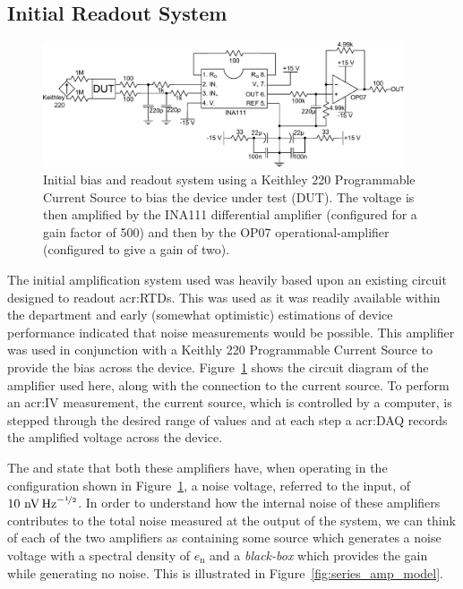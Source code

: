 \subsection{Initial Readout System}
\label{ssec:readout-prelim}
\begin{figure}[ht]
\begin{center}
\includegraphics[width = 0.95\textwidth]{figures/RTD_amp.pdf}
\caption[Initial readout system using RTD amplifier and programmable current source]{Initial bias and readout system using a Keithley 220 Programmable Current Source to bias the device under test (DUT). The voltage is then amplified by the INA111 differential amplifier (configured for a gain factor of 500) and then by the OP07 operational-amplifier (configured to give a gain of two).}
\label{fig:rtd_readout_amp}
\end{center}
\end{figure}
The initial amplification system used was heavily based upon an existing circuit designed to readout \glspl{acr:RTD}. This was used as it was readily available within the department and early (somewhat optimistic) estimations of device performance indicated that noise measurements would be possible. This amplifier was used in conjunction with a Keithly 220 Programmable Current Source to provide the bias across the device. Figure~\ref{fig:rtd_readout_amp} shows the circuit diagram of the amplifier used here, along with the connection to the current source. To perform an \gls{acr:IV} measurement, the current source, which is controlled by a computer, is stepped through the desired range of values and at each step a \gls{acr:DAQ} records the amplified voltage across the device.
\par 
The \textcite{INA1112010} and \textcite{OP07DS} state that both these amplifiers have, when operating in the configuration shown in Figure~\ref{fig:rtd_readout_amp}, a noise voltage, referred to the input, of $10~\mathrm{nV\,Hz}^{-\nicefrac{1}{2}}$. In order to understand how the internal noise of these amplifiers contributes to the total noise measured at the output of the system, we can think of each of the two amplifiers as containing some source which generates a noise voltage with a spectral density of $e_{\mathrm{n}}$ and a \textit{black-box} which provides the gain while generating no noise. This is illustrated in Figure~\ref{fig:series_amp_model}.
